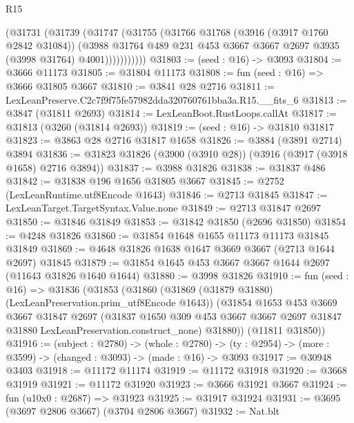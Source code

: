 \begin{lexlean}{R15}
\begin{coremodule}
              (@31731
                (@31739
                  (@31747
                    (@31755
                      (@31766
                        @31768
                        (@3916 (@3917 @1760 @2842 @31084))
                        (@3988
                          @31764
                          @489
                          @231
                          @453
                          @3667
                          @3667
                          @2697
                          @3935
                          (@3998 @31764)
                          @4001)))))))))))
@31803 := (seed : @16) -> @3093
@31804 := @3666 @11173
@31805 := @31804 @11173
@31808 := fun (seed : @16) => @3666 @31805 @3667
@31810 := @3841 @28 @2716
@31811 := LexLeanPreserve.C2c7f9f75fe57982dda320760761bba3a.R15.__fits_6
@31813 := @3847 (@31811 @2693)
@31814 := LexLeanBoot.RustLoops.callAt
@31817 := @31813 (@3260 (@31814 @2693))
@31819 := (seed : @16) -> @31810 @31817
@31823 := @3863 @28 @2716 @31817 @1658
@31826 := @3884 (@3891 @2714) @3894
@31836 := @31823 @31826 (@3900 (@3910 @28)) (@3916 (@3917 (@3918 @1658) @2716 @3894))
@31837 := @3988 @31826
@31838 := @31837 @486
@31842 := @31838 @196 @1656 @31805 @3667
@31845 := @2752 (LexLeanRuntime.utf8Encode @1643)
@31846 := @2713 @31845
@31847 := LexLeanTarget.TargetSyntax.Value.none
@31849 := @2713 @31847 @2697
@31850 := @31846 @31849
@31853 := @31842 @31850 (@2696 @31850)
@31854 := @4248 @31826
@31860 := @31854 @1648 @1655 @11173 @11173 @31845 @31849
@31869 := @4648 @31826 @1638 @1647 @3669 @3667 (@2713 @1644 @2697) @31845
@31879 := @31854 @1645 @453 @3667 @3667 @1644 @2697 (@11643 @31826 @1640 @1644)
@31880 := @3998 @31826
@31910 := fun (seed : @16) =>
  @31836
    (@31853
      (@31860
        (@31869 (@31879 @31880) (LexLeanPreservation.prim_utf8Encode @1643))
        (@31854
          @1653
          @453
          @3669
          @3667
          @31847
          @2697
          (@31837
            @1650
            @309
            @453
            @3667
            @3667
            @2697
            @31847
            @31880
            LexLeanPreservation.construct_none)
          @31880))
      (@11811 @31850))
@31916 := (subject : @2780) ->
  (whole : @2780) -> (ty : @2954) -> (more : @3599) -> (changed : @3093) -> (made : @16) -> @3093
@31917 := @30948 @3403
@31918 := @11172 @11174
@31919 := @11172 @31918
@31920 := @3668 @31919
@31921 := @11172 @31920
@31923 := @3666 @31921 @3667
@31924 := fun (u10x0 : @2687) => @31923
@31925 := @31917 @31924
@31931 := @3695 (@3697 @2806 @3667) (@3704 @2806 @3667)
@31932 := Nat.blt

\end{coremodule}
\end{lexlean}
